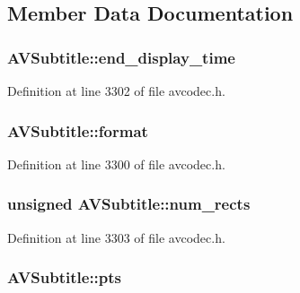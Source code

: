 \subsection{Member Data Documentation}
\subsubsection[{\texorpdfstring{end\+\_\+display\+\_\+time}{end_display_time}}]{ A\+V\+Subtitle\+::end\+\_\+display\+\_\+time}\hypertarget{struct_a_v_subtitle_a354cdfa51cda54c914a569ee3f7493c0}{}\label{struct_a_v_subtitle_a354cdfa51cda54c914a569ee3f7493c0}


Definition at line 3302 of file avcodec.\+h.

\subsubsection[{\texorpdfstring{format}{format}}]{ A\+V\+Subtitle\+::format}\hypertarget{struct_a_v_subtitle_a03cabc402df10e7ee9b92df6284b09c1}{}\label{struct_a_v_subtitle_a03cabc402df10e7ee9b92df6284b09c1}


Definition at line 3300 of file avcodec.\+h.

\subsubsection[{\texorpdfstring{num\+\_\+rects}{num_rects}}]{\setlength{\rightskip}{0pt plus 5cm}unsigned A\+V\+Subtitle\+::num\+\_\+rects}\hypertarget{struct_a_v_subtitle_a89491b1f6998eceb6221791fd50087df}{}\label{struct_a_v_subtitle_a89491b1f6998eceb6221791fd50087df}


Definition at line 3303 of file avcodec.\+h.

\subsubsection[{\texorpdfstring{pts}{pts}}]{ A\+V\+Subtitle\+::pts}\hypertarget{struct_a_v_subtitle_af7cc390bba4f9d6c32e391ca59d117a2}{}\label{struct_a_v_subtitle_af7cc390bba4f9d6c32e391ca59d117a2}


